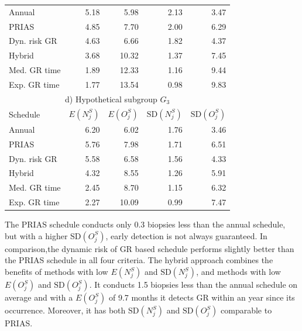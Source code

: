 \begin{table}
\begin{tabular}{lrrrr}
\hline
Annual         & 5.18            & 5.98                & 2.13          & 3.47              \\
PRIAS          & 4.85            & 7.70                & 2.00          & 6.29        \\
Dyn. risk GR       & 4.63            & 6.66                & 1.82          & 4.37              \\
Hybrid       & 3.68            & 10.32                & 1.37          & 7.45              \\
Med. GR time & 1.89             & 12.33               & 1.16          & 9.44              \\
Exp. GR time & 1.77            & 13.54               & 0.98          & 9.83              \\
\hline      
\multicolumn{5}{c}{d) Hypothetical subgroup $G_3$}\\
\hline
Schedule        & $E(N^S_j)$ & $E(O^S_j)$ & ${\mbox{SD}(N^S_j)}$ & ${\mbox{SD}(O^S_j)}$ \\
\hline
Annual         & 6.20             & 6.02                & 1.76          & 3.46              \\
PRIAS          & 5.76             & 7.98                & 1.71         & 6.51        \\
Dyn. risk GR       & 5.58            & 6.58                & 1.56          & 4.33              \\
Hybrid       & 4.32            & 8.55                & 1.26          & 5.91              \\
Med. GR time & 2.45            & 8.70                & 1.15          & 6.32              \\
Exp. GR time & 2.27            & 10.09               & 0.99          & 7.47              \\
\hline     
\end{tabular}
\end{table}

The PRIAS schedule conducts only 0.3 biopsies less than the annual schedule, but with a higher $\mbox{SD}(O^S_j)$, early detection is not always guaranteed. In comparison,the dynamic risk of GR based schedule performs slightly better than the PRIAS schedule in all four criteria. The hybrid approach combines the benefits of methods with low $E(N^S_j)$ and $\mbox{SD}(N^S_j)$, and methods with low $E(O^S_j)$ and $\mbox{SD}(O^S_j)$. It conducts 1.5 biopsies less than the annual schedule on average and with a $E(O^S_j)$ of 9.7 months it detects GR within an year since its occurrence. Moreover, it has both $\mbox{SD}(N^S_j)$ and $\mbox{SD}(O^S_j)$ comparable to PRIAS.

